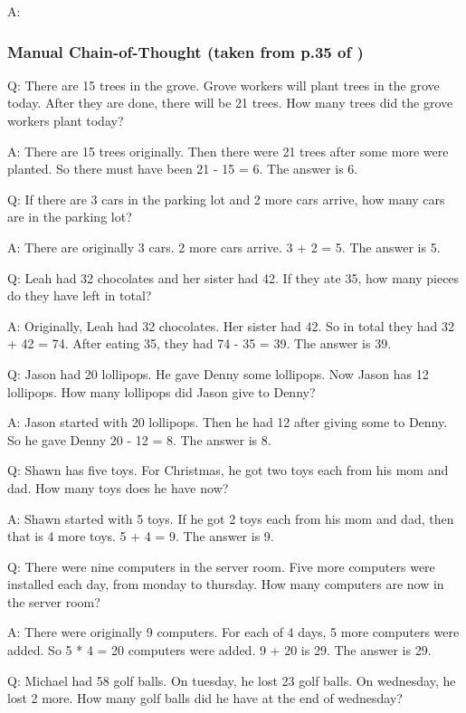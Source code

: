 \documentclass[11pt]{article}
\begin{document}
A:

\subsubsection*{Manual Chain-of-Thought (taken from p.35 of \citealp{wei_chain--thought_nodate})}

Q: There are 15 trees in the grove. Grove workers will plant trees in the grove today. After they are done, there will be 21 trees. How many trees did the grove workers plant today?

A: There are 15 trees originally. Then there were 21 trees after some more were planted. So there must have been 21 - 15 = 6. The answer is 6.

Q: If there are 3 cars in the parking lot and 2 more cars arrive, how many cars are in the parking lot?

A: There are originally 3 cars. 2 more cars arrive. 3 + 2 = 5. The answer is 5.

Q: Leah had 32 chocolates and her sister had 42. If they ate 35, how many pieces do they have left in total?

A: Originally, Leah had 32 chocolates. Her sister had 42. So in total they had 32 + 42 = 74. After eating 35, they had 74 - 35 = 39. The answer is 39.

Q: Jason had 20 lollipops. He gave Denny some lollipops. Now Jason has 12 lollipops. How many lollipops did Jason give to Denny?

A: Jason started with 20 lollipops. Then he had 12 after giving some to Denny. So he gave Denny 20 - 12 = 8. The answer is 8.

Q: Shawn has five toys. For Christmas, he got two toys each from his mom and dad. How many toys does he have now?

A: Shawn started with 5 toys. If he got 2 toys each from his mom and dad, then that is 4 more toys. 5 + 4 = 9. The answer is 9.

Q: There were nine computers in the server room. Five more computers were installed each day, from monday to thursday. How many computers are now in the server room?

A: There were originally 9 computers. For each of 4 days, 5 more computers were added. So 5 * 4 = 20 computers were added. 9 + 20 is 29. The answer is 29.

Q: Michael had 58 golf balls. On tuesday, he lost 23 golf balls. On wednesday, he lost 2 more. How many golf balls did he have at the end of wednesday?
\end{document}
